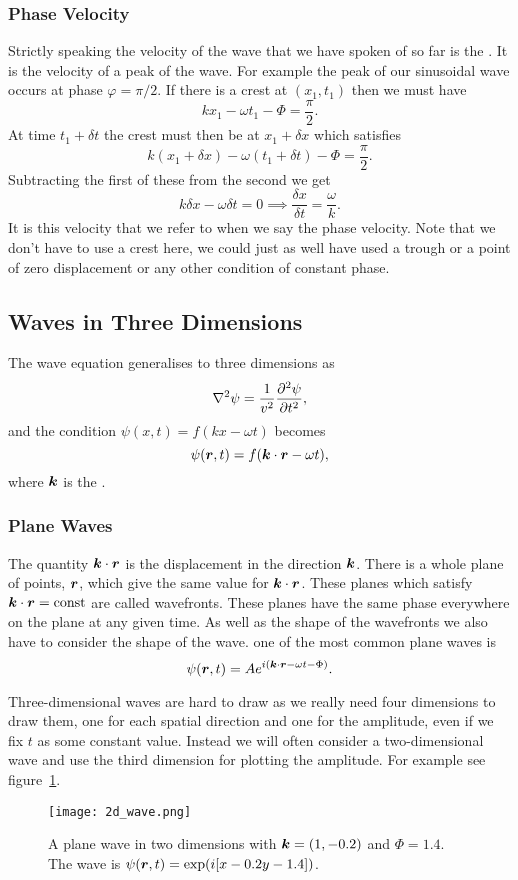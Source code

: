     \subsubsection{Phase Velocity}
    Strictly speaking the velocity of the wave that we have spoken of so far is the .
    It is the velocity of a peak of the wave.
    For example the peak of our sinusoidal wave occurs at phase \(\varphi = \pi / 2\).
    If there is a crest at \((x_1, t_1)\) then we must have
    \[kx_1 - \omega t_1 - \Phi = \frac{\pi}{2}.\]
    At time \(t_1 + \delta t\) the crest must then be at \(x_1 + \delta x\) which satisfies
    \[k(x_1 + \delta x) - \omega(t_1 + \delta t) - \Phi = \frac{\pi}{2}.\]
    Subtracting the first of these from the second we get
    \[k\delta x - \omega\delta t = 0 \implies \frac{\delta x}{\delta t} = \frac{\omega}{k}.\]
    It is this velocity that we refer to when we say the phase velocity.
    Note that we don't have to use a crest here, we could just as well have used a trough or a point of zero displacement or any other condition of constant phase.
    
    \subsection{Waves in Three Dimensions}
    The wave equation generalises to three dimensions as
    \[\nabla^2\psi = \frac{1}{v^2}\pdv[2]{\psi}{t},\]
    and the condition \(\psi(x, t) = f(kx - \omega t)\) becomes \[\psi(\bm{r}, t) = f(\bm{k}\cdot\bm{r} - \omega t),\]
    where \(\bm{k}\) is the .
    
    \subsubsection{Plane Waves}
    The quantity \(\bm{k}\cdot\bm{r}\) is the displacement in the direction \(\bm{k}\).
    There is a whole plane of points, \(\bm{r}\), which give the same value for \(\bm{k}\cdot\bm{r}\).
    These planes which satisfy \(\bm{k}\cdot\bm{r} = \text{const}\) are called wavefronts.
    These planes have the same phase everywhere on the plane at any given time.
    As well as the shape of the wavefronts we also have to consider the shape of the wave.
    one of the most common plane waves is
    \[\psi(\bm{r}, t) = Ae^{i(\bm{k}\cdot\bm{r} - \omega t - \Phi)}.\]
    
    Three-dimensional waves are hard to draw as we really need four dimensions to draw them, one for each spatial direction and one for the amplitude, even if we fix \(t\) as some constant value.
    Instead we will often consider a two-dimensional wave and use the third dimension for plotting the amplitude.
    For example see figure~\ref{fig:2d wave}.
    \begin{figure}[ht]
        \centering
        \texttt{[image: 2d\_wave.png]}
        \caption{A plane wave in two dimensions with \(\bm{k} = (1, -0.2)\) and \(\Phi = 1.4\). The wave is \(\psi(\bm{r}, t) = \exp(i[x - 0.2 y - 1.4])\).}
        \label{fig:2d wave}
    \end{figure}
    
